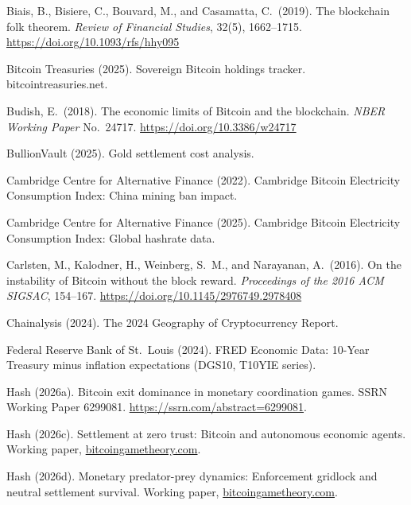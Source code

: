 \documentclass[12pt]{article}
\theoremstyle{definition}
\theoremstyle{remark}
\begin{document}
\begin{description}[style=nextline,leftmargin=0pt,labelsep=0pt,font=\normalfont]

\item Biais, B., Bisiere, C., Bouvard, M., and Casamatta, C.\ (2019). The
blockchain folk theorem. \emph{Review of Financial Studies}, 32(5), 1662--1715.
\url{https://doi.org/10.1093/rfs/hhy095}

\item Bitcoin Treasuries (2025). Sovereign Bitcoin holdings tracker.
bitcointreasuries.net.

\item Budish, E.\ (2018). The economic limits of Bitcoin and the blockchain.
\emph{NBER Working Paper} No.~24717.
\url{https://doi.org/10.3386/w24717}

\item BullionVault (2025). Gold settlement cost analysis.

\item Cambridge Centre for Alternative Finance (2022). Cambridge Bitcoin
Electricity Consumption Index: China mining ban impact.

\item Cambridge Centre for Alternative Finance (2025). Cambridge Bitcoin
Electricity Consumption Index: Global hashrate data.

\item Carlsten, M., Kalodner, H., Weinberg, S.\ M., and Narayanan, A.\ (2016).
On the instability of Bitcoin without the block reward.
\emph{Proceedings of the 2016 ACM SIGSAC}, 154--167.
\url{https://doi.org/10.1145/2976749.2978408}

\item Chainalysis (2024). The 2024 Geography of Cryptocurrency Report.

\item Federal Reserve Bank of St.~Louis (2024). FRED Economic Data: 10-Year
Treasury minus inflation expectations (DGS10, T10YIE series).

\item Hash (2026a). Bitcoin exit dominance in monetary coordination games.
SSRN Working Paper 6299081. \url{https://ssrn.com/abstract=6299081}.

\item Hash (2026c). Settlement at zero trust: Bitcoin and autonomous economic
agents. Working paper, \url{bitcoingametheory.com}.

\item Hash (2026d). Monetary predator-prey dynamics: Enforcement gridlock
and neutral settlement survival. Working paper, \url{bitcoingametheory.com}.


\end{description}
\end{document}
